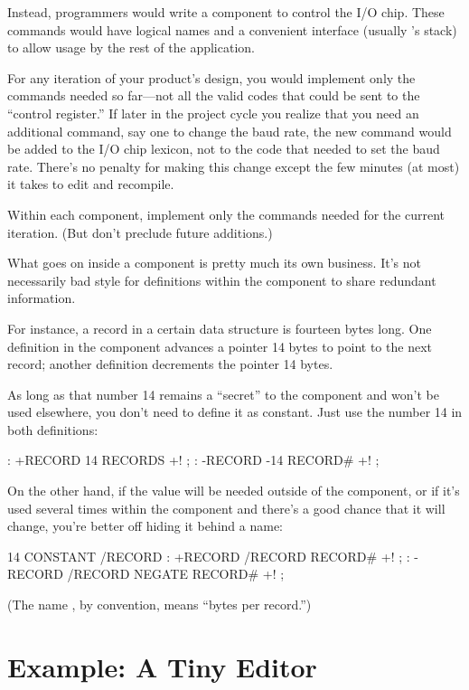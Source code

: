 Instead, \Forth{} programmers would write a component to control the I/O
chip. These commands would have logical names and a convenient
interface (usually \Forth{}'s stack) to allow usage by the rest of the
application.

For any iteration of your product's design, you would implement only
the commands needed so far---not all the valid codes that could be
sent to the ``control register.'' If later in the project cycle you
realize that you need an additional command, say one to change the
baud rate, the new command would be added to the I/O chip lexicon, not
to the code that needed to set the baud rate. There's no penalty for
making this change except the few minutes (at most) it takes to edit
and recompile.

\begin{tip}
Within each component, implement only the commands needed for the
current iteration. (But don't preclude future additions.)
\end{tip}
What goes on inside a component is pretty much its own business. It's
not necessarily bad style for definitions within the component to share
redundant information.

For instance, a record in a certain data structure is fourteen bytes
long. One definition in the component advances a pointer 14 bytes to
point to the next record; another definition decrements the pointer 14
bytes.

As long as that number 14 remains a ``secret'' to the component and
won't be used elsewhere, you don't need to define it as constant. Just use
the number 14 in both definitions:

\begin{Code}
: +RECORD 14 RECORDS +! ;
: -RECORD -14 RECORD# +! ;
\end{Code}
On the other hand, if the value will be needed outside of the component,
or if it's used several times within the component and there's a good
chance that it will change, you're better off hiding it behind a name:

\begin{Code}
14 CONSTANT /RECORD
: +RECORD /RECORD RECORD# +! ;
: -RECORD /RECORD NEGATE RECORD# +! ;
\end{Code}
(The name , by convention, means ``bytes per record.'')

\section{Example: A Tiny Editor}

